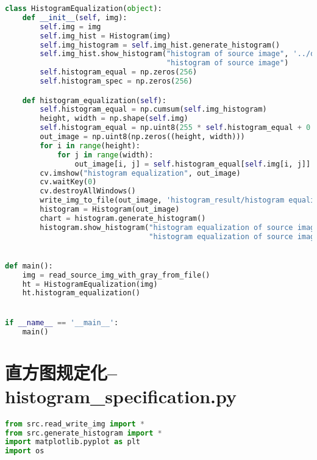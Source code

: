 \documentclass{hitreport}
\begin{document}
\begin{appendices}
\begin{lstlisting}[language=python]
class HistogramEqualization(object):
    def __init__(self, img):
        self.img = img
        self.img_hist = Histogram(img)
        self.img_histogram = self.img_hist.generate_histogram()
        self.img_hist.show_histogram("histogram of source image", '../data/histogram_result/',
                                     "histogram of source image")
        self.histogram_equal = np.zeros(256)
        self.histogram_spec = np.zeros(256)

    def histogram_equalization(self):
        self.histogram_equal = np.cumsum(self.img_histogram)
        height, width = np.shape(self.img)
        self.histogram_equal = np.uint8(255 * self.histogram_equal + 0.5)
        out_image = np.uint8(np.zeros((height, width)))
        for i in range(height):
            for j in range(width):
                out_image[i, j] = self.histogram_equal[self.img[i, j]]
        cv.imshow("histogram equalization", out_image)
        cv.waitKey(0)
        cv.destroyAllWindows()
        write_img_to_file(out_image, 'histogram_result/histogram equalization of source image')
        histogram = Histogram(out_image)
        chart = histogram.generate_histogram()
        histogram.show_histogram("histogram equalization of source image", '../data/histogram_result/',
                                 "histogram equalization of source image")


def main():
    img = read_source_img_with_gray_from_file()
    ht = HistogramEqualization(img)
    ht.histogram_equalization()


if __name__ == '__main__':
    main()

\end{lstlisting}

\section{直方图规定化--histogram\_specification.py}\label{app:hisspec}
\begin{lstlisting}[language=python]
from src.read_write_img import *
from src.generate_histogram import *
import matplotlib.pyplot as plt
import os



\end{lstlisting}
\end{appendices}
\end{document}
